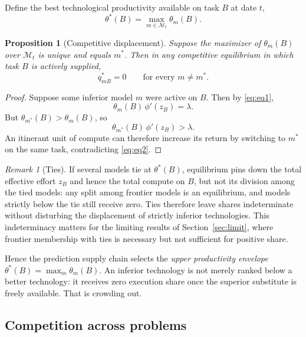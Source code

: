 \documentclass[11pt]{article}
\newtheorem{proposition}{Proposition}
\theoremstyle{definition}
\theoremstyle{remark}
\newtheorem{remark}{Remark}
\begin{document}
Define the best technological productivity available on task $B$ at date $t$,
\begin{equation}
\theta^*(B) = \max_{m \in \mathcal{M}_t} \theta_m(B).
\end{equation}

\begin{proposition}[Competitive displacement]
\label{prop:displacement}
Suppose the maximizer of $\theta_m(B)$ over $\mathcal{M}_t$ is unique and equals $m^*$. Then in any competitive equilibrium in which task $B$ is actively supplied,
\begin{equation}
q^*_{mB} = 0 \qquad \text{for every } m \neq m^*.
\end{equation}
\end{proposition}

\begin{proof}
Suppose some inferior model $m$ were active on $B$. Then by \eqref{eq:eq1},
\begin{equation}
\theta_m(B)\, \phi'(z_B) = \lambda.
\end{equation}
But $\theta_{m^*}(B) > \theta_m(B)$, so
\begin{equation}
\theta_{m^*}(B)\, \phi'(z_B) > \lambda.
\end{equation}
An itinerant unit of compute can therefore increase its return by switching to $m^*$ on the same task, contradicting \eqref{eq:eq2}.
\end{proof}

\begin{remark}[Ties]
\label{rem:ties}
If several models tie at $\theta^*(B)$, equilibrium pins down the total effective effort $z_B$ and hence the total compute on $B$, but not its division among the tied models: any split among frontier models is an equilibrium, and models strictly below the tie still receive zero. Ties therefore leave shares indeterminate without disturbing the displacement of strictly inferior technologies. This indeterminacy matters for the limiting results of Section~\ref{sec:limit}, where frontier membership with ties is necessary but not sufficient for positive share.
\end{remark}

Hence the prediction supply chain selects the \emph{upper productivity envelope} $\theta^*(B) = \max_m \theta_m(B)$. An inferior technology is not merely ranked below a better technology: it receives zero execution share once the superior substitute is freely available. That is crowding out.

\subsection{Competition across problems}
\end{document}
